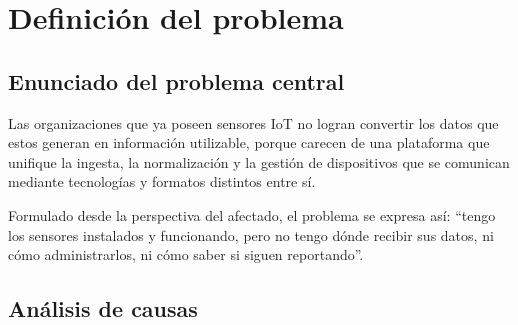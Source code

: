 \section{Definición del problema}
\label{sec:problema}

\subsection{Enunciado del problema central}

\begin{cajaclave}[title={Problema central}]
Las organizaciones que ya poseen sensores IoT no logran convertir los datos que estos generan en
información utilizable, porque carecen de una plataforma que unifique la ingesta, la normalización y la
gestión de dispositivos que se comunican mediante tecnologías y formatos distintos entre sí.
\end{cajaclave}

Formulado desde la perspectiva del afectado, el problema se expresa así: \enquote{tengo los sensores
instalados y funcionando, pero no tengo dónde recibir sus datos, ni cómo administrarlos, ni cómo saber
si siguen reportando}.

\subsection{Análisis de causas}


